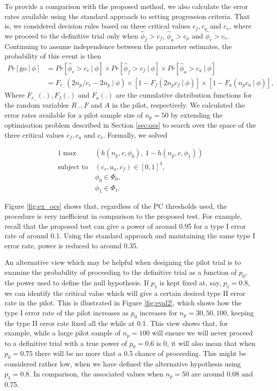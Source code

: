 \documentclass[AMA,STIX1COL]{WileyNJD-v2}
\begin{document}
To provide a comparison with the proposed method, we also calculate the error rates available using the standard approach to setting progression criteria. That is, we considered decision rules based on three critical values $c_f, c_a$ and $c_r$, where we proceed to the definitive trial only when $\hat{\phi}_f > c_f$, $\hat{\phi}_a > c_a$ and $\hat{\phi}_r > c_r$. Continuing to assume independence between the parameter estimates, the probability of this event is then
\begin{align*}
Pr[\text{go} ~ | ~ \phi] &= Pr[\hat{\phi}_r > c_r ~ | ~ \phi] \times Pr[ \hat{\phi}_f > c_f ~ | ~ \phi] \times Pr[ \hat{\phi}_a > c_a ~ | ~ \phi] \\
&= F_{r_-}( 2n_p/c_r - 2n_p ~ | ~ \phi) \times [1-F_f(2n_p c_f ~ | ~ \phi)] \times [1-F_a(n_p c_a ~ | ~ \phi)],
\end{align*}
Where $F_{r_-}(.), F_f(.)$ and $F_a(.)$ are the cumulative distribution functions for the random variables $R_-, F$ and $A$ in the pilot, respectively. We calculated the error rates available for a pilot sample size of $n_p = 50$ by extending the optimisation problem described in Section \ref{sec:ocs} to search over the space of the three critical values  $c_f, c_a$ and $c_r$. Formally, we solved

\begin{alignat*}{1}
\max ~ & \left(h(n_p, c, \phi_0) , ~ 1 - h(n_p, c, \phi_1) \right) \\
\text{subject to} ~ & (c_r, a_a, c_f) \in [0,1]^3, \\
& \phi_0 \in \Phi_0, \\
& \phi_1 \in \Phi_1. 
\end{alignat*}

Figure \ref{fig:ex_ocs} shows that, regardless of the PC thresholds used, the procedure is very inefficient in comparison to the proposed test. For example, recall that the proposed test can give a power of around 0.95 for a type I error rate of around 0.1. Using the standard approach and maintaining the same type I error rate, power is reduced to around 0.35.

An alternative view which may be helpful when designing the pilot trial is to examine the probability of proceeding to the definitive trial as a function of $p_0$, the power used to define the null hypothesis. If $p_1$ is kept fixed at, say, $p_1 = 0.8$, we can identify the critical value which will give a certain desired type II error rate in the pilot. This is illustrated in Figure \ref{fig:eval2}, which shows how the type I error rate of the pilot increases as $p_0$ increases for $n_p = 30, 50, 100$, keeping the type II error rate fixed all the while at 0.1. This view shows that, for example, while a large pilot sample of $n_p = 100$ will ensure we will never proceed to a definitive trial with a true power of $p_0 = 0.6$ is 0, it will also mean that when $p_0 = 0.75$ there will be no more that a 0.5 chance of proceeding. This might be considered rather low, when we have defined the alternative hypothesis using $p_1 = 0.8$. In comparison, the associated values when $n_p = 50$ are around 0.08 and 0.75.
\end{document}
